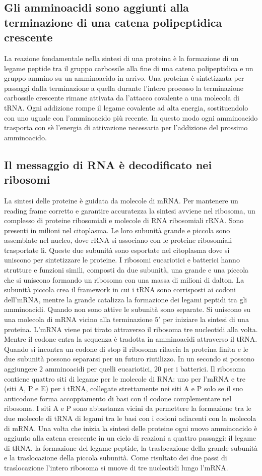 \subsection{Gli amminoacidi sono aggiunti alla terminazione  di una catena polipeptidica crescente}
La reazione fondamentale nella sintesi di una proteina \`e la formazione di un legame peptide tra il gruppo carbossile alla fine di una catena polipeptidica e un gruppo ammino su un 
amminoacido in arrivo. Una proteina \`e sintetizzata per passaggi dalla terminazione  a quella  durante l'intero processo la terminazione carbossile crescente rimane
attivata da l'attacco covalente a una molecola di tRNA. Ogni addizione rompe il legame covalente ad alta energia, sostituendolo con uno uguale con l'amminoacido pi\`u recente. In
questo modo ogni amminoacido trasporta con s\`e l'energia di attivazione necessaria per l'addizione del prossimo amminoacido. 
\subsection{Il messaggio di RNA \`e decodificato nei ribosomi}
La sintesi delle proteine \`e guidata da molecole di mRNA. Per mantenere un reading frame corretto e garantire accuratezza la sintesi avviene nel ribosoma, un complesso di proteine
ribosomiali e molecole di RNA ribosomiali rRNA. Sono presenti in milioni nel citoplasma. Le loro subunit\`a grande e piccola sono assemblate nel nucleo, dove rRNA si associano con le 
proteine ribosomiali trasportate l\`i. Queste due subunit\`a sono esportate nel citoplasma dove si uniscono per sintetizzare le proteine. I ribosomi eucariotici e batterici hanno
strutture e funzioni simili, composti da due subunit\`a, una grande e una piccola che si uniscono formando un ribosoma con una massa di milioni di dalton. La subunit\`a piccola 
crea il framework in cui i tRNA sono corrisposti ai codoni dell'mRNA, mentre la grande catalizza la formazione dei legami peptidi tra gli amminoacidi. Quando non sono attive le 
subunit\`a sono separate. Si uniscono su una molecola di mRNA vicino alla terminazione $5'$ per iniziare la sintesi di una proteina. L'mRNA viene poi tirato attraverso il ribosoma tre
nucleotidi alla volta. Mentre il codone entra la sequenza \`e tradotta in amminoacidi attraverso il tRNA. Quando si incontra un codone di stop il ribosoma rilascia la proteina finita e 
le due subunit\`a possono separarsi per un futuro riutilizzo. In un secondo si possono aggiungere $2$ amminoacidi per quelli eucariotici, $20$ per i batterici. Il ribosoma contiene
quattro siti di legame per le molecole di RNA: uno per l'mRNA e tre (siti A, P e E) per i tRNA, collegate strettamente nei siti A e P solo se il suo anticodone forma accoppiamento di 
basi con il codone complementare nel ribosoma. I siti A e P sono abbastanza vicini da permettere la formazione tra le due molecole di tRNA di legami tra le basi con i codoni adiacenti
con la molecola di mRNA. Una volta che inizia la sintesi delle proteine ogni nuovo amminoacido \`e aggiunto alla catena crescente in un ciclo di reazioni a quattro passaggi: il legame
di tRNA, la formazione del legame peptide, la traslocazione della grande subunit\`a e la traslocazione della piccola subunit\`a. Come risultato dei due passi di traslocazione l'intero
ribosoma si muove di tre nucleotidi lungo l'mRNA.

